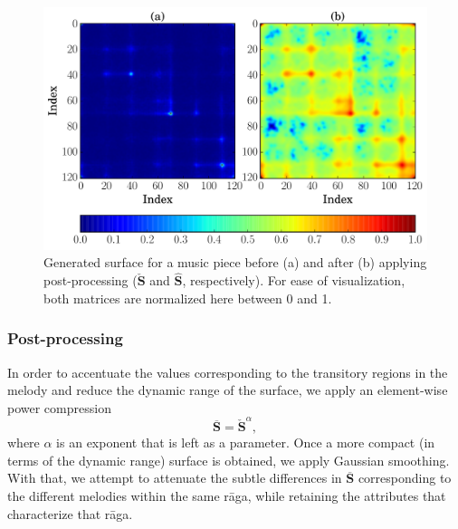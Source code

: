 \begin{figure}[t]
	\begin{center}
		\includegraphics[width=\figSizeEighty]{ch07_ragaRecognition/figures/PSfeature_e59642ca-72bc-466b-bf4b-d82bfbc7b4af.pdf}
	\end{center}\vspace{-1.5em}
	\caption{Generated surface for a music piece before (a) and after (b) applying post-processing ($\check{\mathbf{S}}$ and $\hat{\mathbf{S}}$, respectively). For ease of visualization, both matrices are normalized here between 0 and 1.}
	\label{fig:phase_space_surface}
	\vspace{-0.5em}
\end{figure}

\subsubsection{Post-processing}
\label{sec:tdms_post_processing}

In order to accentuate the values corresponding to the transitory regions in the melody and reduce the dynamic range of the surface, we apply an element-wise power compression %
\begin{equation*}
\overline{\mathbf{S}}= \check{\mathbf{S}}^\alpha ,
\end{equation*}
where $\alpha$ is an exponent that is left as a parameter. Once a more compact (in terms of the dynamic range) surface is obtained, we apply Gaussian smoothing. With that, we attempt to attenuate the subtle differences in $\overline{\mathbf{S}}$ corresponding to the different melodies within the same r\={a}ga, while retaining the attributes that characterize that r\={a}ga. 

